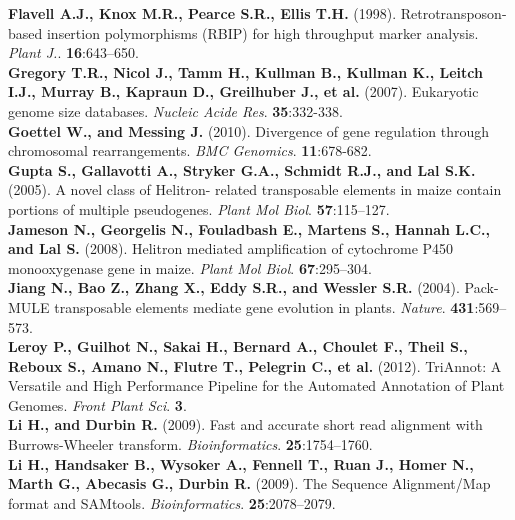 \documentclass[a4paper, 12pt]{article}
\begin{document}
\begin{onehalfspace}
\begin{flushleft}
\vspace{0.3cm}
\textbf{Flavell A.J., Knox M.R., Pearce S.R., Ellis T.H.} (1998). Retrotransposon-based insertion polymorphisms (RBIP) for high throughput marker analysis. \textit{Plant J.}. \textbf{16}:643–650.\\
\vspace{0.3cm}
\textbf{Gregory T.R., Nicol J., Tamm H., Kullman B., Kullman K., Leitch I.J., Murray B., Kapraun D., Greilhuber J., et al.} (2007). Eukaryotic genome size databases. \textit{Nucleic Acide Res}. \textbf{35}:332-338.\\
\vspace{0.3cm}
\textbf{Goettel W., and Messing J.} (2010). Divergence of gene regulation through chromosomal rearrangements. \textit{BMC Genomics}. \textbf{11}:678-682.\\
\vspace{0.3cm}
\textbf{Gupta S., Gallavotti A., Stryker G.A., Schmidt R.J., and Lal S.K.} (2005). A novel class of Helitron- related transposable elements in maize contain portions of multiple pseudogenes. \textit{Plant Mol Biol}. \textbf{57}:115–127.\\
\vspace{0.3cm}
\textbf{Jameson N., Georgelis N., Fouladbash E., Martens S., Hannah L.C., and Lal S.} (2008). Helitron mediated amplification of cytochrome P450 monooxygenase gene in maize. \textit{Plant Mol Biol}. \textbf{67}:295–304.\\
\vspace{0.3cm}
\textbf{Jiang N., Bao Z., Zhang X., Eddy S.R., and Wessler S.R.} (2004). Pack-MULE transposable elements mediate gene evolution in plants. \textit{Nature}. \textbf{431}:569–573.\\
\vspace{0.3cm}
\textbf{Leroy P., Guilhot N., Sakai H., Bernard A., Choulet F., Theil S., Reboux S., Amano N., Flutre T., Pelegrin C., et al.} (2012). TriAnnot: A Versatile and High Performance Pipeline for the Automated Annotation of Plant Genomes. \textit{Front Plant Sci}. \textbf{3}.\\
\vspace{0.3cm}
\textbf{Li H., and Durbin R.} (2009). Fast and accurate short read alignment with Burrows-Wheeler transform. \textit{Bioinformatics}. \textbf{25}:1754–1760.\\
\vspace{0.3cm}
\textbf{Li H., Handsaker B., Wysoker A., Fennell T., Ruan J., Homer N., Marth G., Abecasis G., Durbin R.} (2009). The Sequence Alignment/Map format and SAMtools. \textit{Bioinformatics}. \textbf{25}:2078–2079.\\

\end{flushleft}
\end{onehalfspace}
\end{document}
